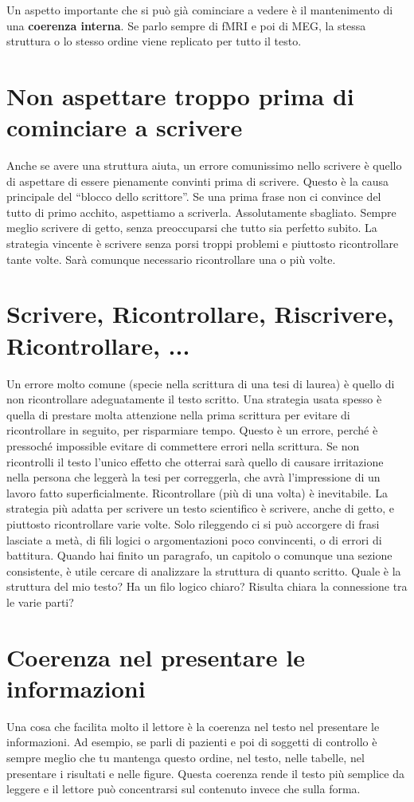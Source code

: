 \documentclass[12pt]{book}
\newcommand{\oq}{``} %
\newcommand{\cq}{''} %
\begin{document}
Un aspetto importante che si può già cominciare a vedere è il mantenimento di una \textbf{coerenza interna}. Se parlo sempre di fMRI e poi di MEG, la stessa struttura o lo stesso ordine viene replicato per tutto il testo. 

\section{Non aspettare troppo prima di cominciare a scrivere}
Anche se avere una struttura aiuta, un errore comunissimo nello scrivere è quello di aspettare di essere pienamente convinti prima di scrivere. Questo è la causa principale del \oq blocco dello scrittore\cq. Se una prima frase non ci convince del tutto di primo acchito, aspettiamo a scriverla. Assolutamente sbagliato. Sempre meglio scrivere di getto, senza preoccuparsi che tutto sia perfetto subito. La strategia vincente è scrivere senza porsi troppi problemi e piuttosto ricontrollare tante volte. Sarà comunque necessario ricontrollare una o più volte.

\section{Scrivere, Ricontrollare, Riscrivere, Ricontrollare, ...}
Un errore molto comune (specie nella scrittura di una tesi di laurea) è quello di non ricontrollare adeguatamente il testo scritto. Una strategia usata spesso è quella di prestare molta attenzione nella prima scrittura per evitare di ricontrollare in seguito, per risparmiare tempo. Questo è un errore, perché è pressoché impossible evitare di commettere errori nella scrittura. Se non ricontrolli il testo l'unico effetto che otterrai sarà quello di causare irritazione nella persona che leggerà la tesi per correggerla, che avrà l'impressione di un lavoro fatto superficialmente. Ricontrollare (più di una volta) è inevitabile. La strategia più adatta per scrivere un testo scientifico è scrivere, anche di getto, e piuttosto ricontrollare varie volte. Solo rileggendo ci si può accorgere di frasi lasciate a metà, di fili logici o argomentazioni poco convincenti, o di errori di battitura. 
Quando hai finito un paragrafo, un capitolo o comunque una sezione consistente, è utile cercare di analizzare la struttura di quanto scritto. Quale è la struttura del mio testo? Ha un filo logico chiaro? Risulta chiara la connessione tra le varie parti?


\section{Coerenza nel presentare le informazioni}
Una cosa che facilita molto il lettore è la coerenza nel testo nel presentare le informazioni. Ad esempio, se parli di pazienti e poi di soggetti di controllo è sempre meglio che tu mantenga questo ordine, nel testo, nelle tabelle, nel presentare i risultati e nelle figure. Questa coerenza rende il testo più semplice da leggere e il lettore può concentrarsi sul contenuto invece che sulla forma.
\end{document}
